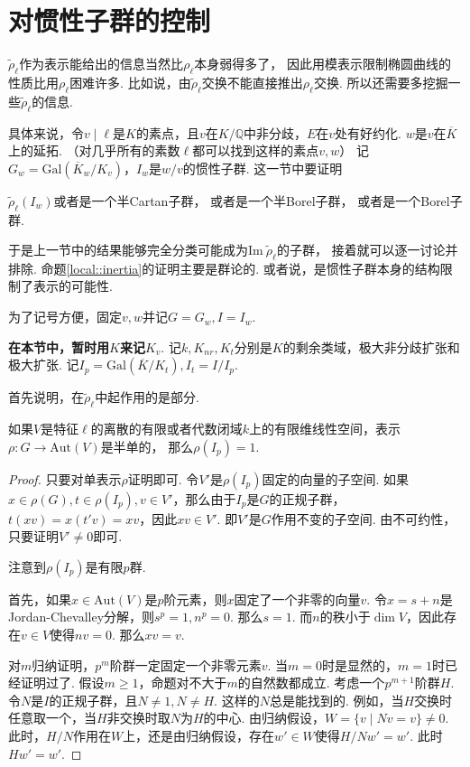 \section{对惯性子群的控制}

$\tilde{\rho}_{\ell}$作为表示能给出的信息当然比$\rho_{\ell}$本身弱得多了，
因此用模表示限制椭圆曲线的性质比用$\rho_{\ell}$困难许多.
比如说，由$\tilde{\rho}_{\ell}$交换不能直接推出$\rho_{\ell}$交换.
所以还需要多挖掘一些$\tilde{\rho}_{\ell}$的信息.

具体来说，令$v\mid \ell$是$K$的素点，且$v$在$K/\mathbb{Q}$中非分歧，$E$在$v$处有好约化.
$w$是$v$在$\overline{K}$上的延拓.
（对几乎所有的素数$\ell$都可以找到这样的素点$v, w$）
记$G_w=\mathrm{Gal}(\overline{K}_w/K_v)$，$I_w$是$w/v$的惯性子群.
这一节中要证明
\begin{cprop}
    $\tilde{\rho}_{\ell}(I_w)$或者是一个半Cartan子群，
    或者是一个半Borel子群，
    或者是一个Borel子群. \label{local::inertia}
\end{cprop}

于是上一节中的结果能够完全分类可能成为$\mathrm{Im}\ \tilde{\rho}_{\ell}$的子群，
接着就可以逐一讨论并排除.
命题\ref{local::inertia}的证明主要是群论的. 或者说，是惯性子群本身的结构限制了表示的可能性.

为了记号方便，固定$v,w$并记$G = G_w, I = I_w$.

{\bfseries 在本节中，暂时用$K$来记$K_v$}. 记$k,K_{nr},K_{t}$分别是$K$的剩余类域，极大非分歧扩张和极大\tame 扩张.
记$I_p = \mathrm{Gal}(\overline{K}/K_t), I_t = I/I_p$.

首先说明，在$\tilde{\rho}_{\ell}$中起作用的是\tame 部分.

\begin{cprop}
    如果$V$是特征$\ell$的离散的有限或者代数闭域$k$上的有限维线性空间，表示$\rho: G\to \mathrm{Aut}(V)$是半单的，
    那么$\rho(I_p) = 1$.
\end{cprop}

\begin{proof}
    只要对单表示$\rho$证明即可. 令$V'$是$\rho(I_p)$固定的向量的子空间.
    如果$x\in \rho(G),t\in \rho(I_p), v\in V'$，那么由于$I_p$是$G$的正规子群，
    $t(xv) = x(t'v)=xv$，因此$xv\in V'$. 即$V'$是$G$作用不变的子空间.
    由不可约性，只要证明$V'\neq 0$即可.
    
    注意到$\rho(I_p)$是有限$p$群.

    首先，如果$x\in\mathrm{Aut}(V)$是$p$阶元素，则$x$固定了一个非零的向量$v$.
    令$x=s+n$是Jordan-Chevalley分解，则$s^p = 1, n^p = 0$. 那么$s = 1$.
    而$n$的秩小于$\dim V$，因此存在$v\in V$使得$nv=0$. 那么$xv = v$.

    对$m$归纳证明，$p^m$阶群一定固定一个非零元素$v$. 当$m=0$时是显然的，$m=1$时已经证明过了.
    假设$m\geq 1$，命题对不大于$m$的自然数都成立. 考虑一个$p^{m+1}$阶群$H$.
    令$N$是$I$的正规子群，且$N\neq 1,N\neq H$. 这样的$N$总是能找到的.
    例如，当$H$交换时任意取一个，当$H$非交换时取$N$为$H$的中心.
    由归纳假设，$W = \{v\mid Nv=v\}\neq 0$.
    此时，$H/N$作用在$W$上，还是由归纳假设，存在$w'\in W$使得$H/N w' = w'$.
    此时$Hw' = w'$.
\end{proof}

